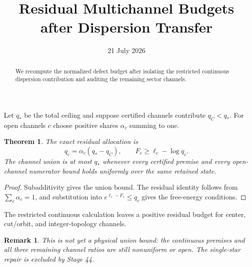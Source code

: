 \documentclass[11pt]{article}\usepackage[margin=1in]{geometry}\usepackage{amsmath,amsthm}\newtheorem{theorem}{Theorem}\newtheorem{remark}{Remark}
\title{Residual Multichannel Budgets after Dispersion Transfer}\author{}\date{21 July 2026}
\begin{document}
\maketitle
\begin{abstract}We recompute the normalized defect budget after isolating the
restricted continuous dispersion contribution and auditing the remaining
sector channels.\end{abstract}
Let $q_*$ be the total ceiling and suppose certified channels contribute $q_C<q_*$. For open channels $c$ choose positive shares $\alpha_c$ summing to one.
\begin{theorem}The exact residual allocation is
\[q_c=\alpha_c(q_*-q_C),\qquad F_c\ge \ell_c-\log q_c.
\]
The channel union is at most $q_*$ whenever every certified premise and every open-channel numerator bound holds uniformly over the same retained state.\end{theorem}
\begin{proof}Subadditivity gives the union bound. The residual identity follows from $\sum_c\alpha_c=1$, and substitution into $e^{\ell_c-F_c}\le q_c$ gives the free-energy conditions.\end{proof}
The restricted continuous calculation leaves a positive residual budget for center, cut/orbit, and integer-topology channels.
\begin{remark}This is not yet a physical union bound: the continuous premises and all three remaining channel ratios are still nonuniform or open. The single-star repair is excluded by Stage 44.\end{remark}
\end{document}
